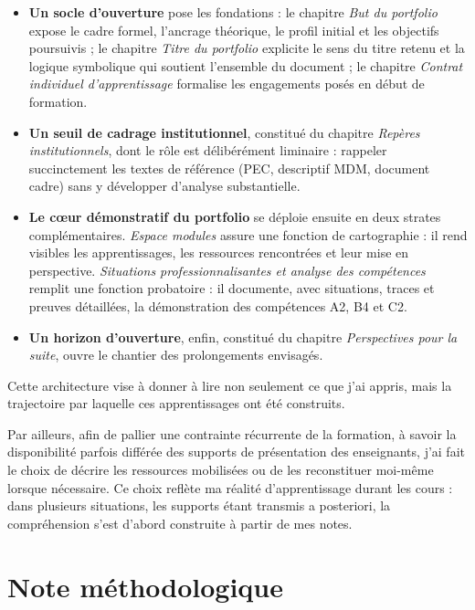 \begin{itemize}
    \item \textbf{Un socle d'ouverture} pose les fondations : le chapitre \emph{But du portfolio} expose le cadre formel, l'ancrage théorique, le profil initial et les objectifs poursuivis ; le chapitre \emph{Titre du portfolio} explicite le sens du titre retenu et la logique symbolique qui soutient l'ensemble du document ; le chapitre \emph{Contrat individuel d'apprentissage} formalise les engagements posés en début de formation.

    \item \textbf{Un seuil de cadrage institutionnel}, constitué du chapitre \emph{Repères institutionnels}, dont le rôle est délibérément liminaire : rappeler succinctement les textes de référence (PEC, descriptif MDM, document cadre) sans y développer d'analyse substantielle.

    \item \textbf{Le cœur démonstratif du portfolio} se déploie ensuite en deux strates complémentaires. \emph{Espace modules} assure une fonction de cartographie : il rend visibles les apprentissages, les ressources rencontrées et leur mise en perspective. \emph{Situations professionnalisantes et analyse des compétences} remplit une fonction probatoire : il documente, avec situations, traces et preuves détaillées, la démonstration des compétences A2, B4 et C2.

    \item \textbf{Un horizon d'ouverture}, enfin, constitué du chapitre \emph{Perspectives pour la suite}, ouvre le chantier des prolongements envisagés.
\end{itemize}

Cette architecture vise à donner à lire non seulement ce que j'ai appris, mais la trajectoire par laquelle ces apprentissages ont été construits.

Par ailleurs, afin de pallier une contrainte récurrente de la formation, à savoir la disponibilité parfois différée des supports de présentation des enseignants, j'ai fait le choix de décrire les ressources mobilisées ou de les reconstituer moi-même lorsque nécessaire. Ce choix reflète ma réalité d'apprentissage durant les cours : dans plusieurs situations, les supports étant transmis a posteriori, la compréhension s'est d'abord construite à partir de mes notes.

\section{Note méthodologique}
\label{sec:note-methodologique}

